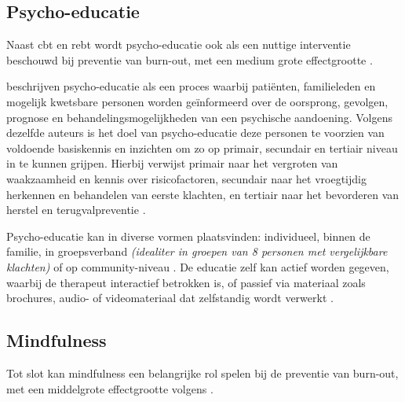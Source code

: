 \vspace{1em}

\subsection{Psycho-educatie}
\label{subsec:psycho-educatie}

\vspace{1em}

Naast \acrlong{cbt} en \acrlong{rebt} wordt psycho-educatie ook als een nuttige interventie beschouwd bij preventie van burn-out, met een medium grote effectgrootte \autocite{Madigan2023}. 

\vspace{1em}

\textcite{Sarkhel2020} beschrijven psycho-educatie als een proces waarbij patiënten, familieleden en mogelijk kwetsbare personen worden geïnformeerd over de oorsprong, gevolgen, prognose en behandelingsmogelijkheden van een psychische aandoening. Volgens dezelfde auteurs is het doel van psycho-educatie deze personen te voorzien van voldoende basiskennis en inzichten om zo op primair, secundair en tertiair niveau in te kunnen grijpen. Hierbij verwijst primair naar het vergroten van waakzaamheid en kennis over risicofactoren, secundair naar het vroegtijdig herkennen en behandelen van eerste klachten, en tertiair naar het bevorderen van herstel en terugvalpreventie \autocite{Sarkhel2020}.

\vspace{1em}

Psycho-educatie kan in diverse vormen plaatsvinden: individueel, binnen de familie, in groepsverband \textit{(idealiter in groepen van 8 personen met vergelijkbare klachten)} of op community-niveau \autocite{Sarkhel2020}. De educatie zelf kan actief worden gegeven, waarbij de therapeut interactief betrokken is, of passief via materiaal zoals brochures, audio- of videomateriaal dat zelfstandig wordt verwerkt \autocite{Sarkhel2020}.

\vspace{1em}

\subsection{Mindfulness}
\label{subsec:mindfulness}

\vspace{1em}

Tot slot kan mindfulness een belangrijke rol spelen bij de preventie van burn-out, met een middelgrote effectgrootte volgens \textcite{Madigan2023}.

